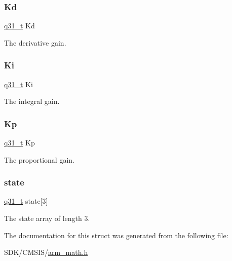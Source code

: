 \subsubsection{\texorpdfstring{Kd}{Kd}}
{\footnotesize\ttfamily \mbox{\hyperlink{arm__math_8h_adc89a3547f5324b7b3b95adec3806bc0}{q31\+\_\+t}} Kd}

The derivative gain. \mbox{\label{structarm__pid__instance__q31_a84a6c05c16369c905193da0d5fc9a7b0}} 
\subsubsection{\texorpdfstring{Ki}{Ki}}
{\footnotesize\ttfamily \mbox{\hyperlink{arm__math_8h_adc89a3547f5324b7b3b95adec3806bc0}{q31\+\_\+t}} Ki}

The integral gain. \mbox{\label{structarm__pid__instance__q31_a6ec4b37fe2246a7e017dd07578fe5bbd}} 
\subsubsection{\texorpdfstring{Kp}{Kp}}
{\footnotesize\ttfamily \mbox{\hyperlink{arm__math_8h_adc89a3547f5324b7b3b95adec3806bc0}{q31\+\_\+t}} Kp}

The proportional gain. \mbox{\label{structarm__pid__instance__q31_af0a2da4da9a94af652873ec7e7be4880}} 
\subsubsection{\texorpdfstring{state}{state}}
{\footnotesize\ttfamily \mbox{\hyperlink{arm__math_8h_adc89a3547f5324b7b3b95adec3806bc0}{q31\+\_\+t}} state\mbox{[}3\mbox{]}}

The state array of length 3. 

The documentation for this struct was generated from the following file\+:\begin{DoxyCompactItemize}
\item 
S\+D\+K/\+C\+M\+S\+I\+S/\mbox{\hyperlink{arm__math_8h}{arm\+\_\+math.\+h}}\end{DoxyCompactItemize}
